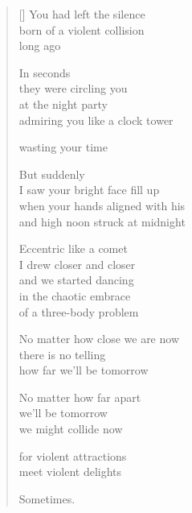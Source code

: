 \documentclass[12pt,a4paper]{article}
\begin{document}
\thispagestyle{empty}


\settowidth{\versewidth}{born of a violent collision long ago.}

\bigskip

\begin{verse}[\versewidth]
  You had left the silence \\
  born of a violent collision \\
  long ago

  In seconds \\
  they were circling you \\
  at the night party \\
  admiring you like a clock tower

  wasting your time

  But suddenly \\
  I saw your bright face fill up \\
  when your hands aligned with his \\
  and high noon struck at midnight

  Eccentric like a comet \\
  I drew closer and closer \\
  and we started dancing \\
  in the chaotic embrace \\
  of a three-body problem

  No matter how close we are now \\
  there is no telling \\
  how far we'll be tomorrow

  No matter how far apart \\
  we'll be tomorrow \\
  we might collide now

  for violent attractions \\
  meet violent delights

  Sometimes.
\end{verse}
\end{document}
